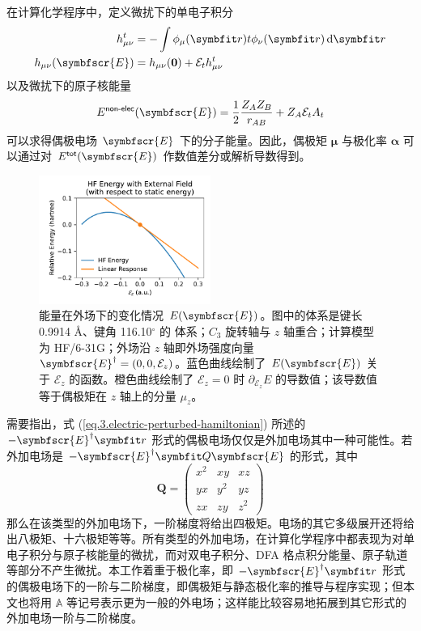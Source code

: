 在计算化学程序中，定义微扰下的单电子积分
\begin{align}
    h_{\mu \nu}^{t} &= - \int \phi_\mu (\bm{r}) t \phi_\nu (\bm{r}) \, \mathrm{d} \bm{r} \\
    \label{eq.3.def.huv-with-perturb}
    h_{\mu \nu} (\symbfscr{E}) &= h_{\mu \nu} (\mathbf{0}) + \mathcal{E}_t h_{\mu \nu}^t
\end{align}
以及微扰下的原子核能量
\begin{equation}
    E^\textsf{non-elec} (\symbfscr{E}) = \frac{1}{2} \frac{Z_A Z_B}{r_{AB}} + Z_A \mathcal{E}_t A_t
\end{equation}
可以求得偶极电场 $\symbfscr{E}$ 下的分子能量。因此，偶极矩 $\bm{\mu}$ 与极化率 $\bm{\alpha}$ 可以通过对 $E^\textsf{tot} (\symbfscr{E})$ 作数值差分或解析导数得到。

\begin{figure}
    \centering
    \includegraphics[width=0.5\textwidth]{assets/NumDipole-z.pdf}
    \caption[能量在外加偶极电场下的变化情况]{能量在外场下的变化情况 $E(\symbfscr{E})$。图中的体系是键长 0.9914 \AA、键角 116.10$^\circ$ 的  体系；$C_3$ 旋转轴与 $z$ 轴重合；计算模型为 HF/6-31G；外场沿 $z$ 轴即外场强度向量 $\symbfscr{E}^\dagger = (0, 0, \mathcal{E}_z)$。蓝色曲线绘制了 $E(\symbfscr{E})$ 关于 $\mathcal{E}_z$ 的函数。橙色曲线绘制了 $\mathcal{E}_z = 0$ 时 $\partial_{\mathcal{E}_z} E$ 的导数值；该导数值等于偶极矩在 $z$ 轴上的分量 $\mu_z$。}
    \label{fig.3.NumDipole-z}
\end{figure}

需要指出，式 (\ref{eq.3.electric-perturbed-hamiltonian}) 所述的 $- \symbfscr{E}^\dagger \bm{r}$ 形式的偶极电场仅仅是外加电场其中一种可能性。若外加电场是 $- \symbfscr{E}^\dagger \bm{Q} \symbfscr{E}$ 的形式，其中
\begin{equation*}
    \bm{Q} =
    \begin{pmatrix}
        x^2 & xy & xz \\
        yx & y^2 & yz \\
        zx & zy & z^2
    \end{pmatrix}
\end{equation*}
那么在该类型的外加电场下，一阶梯度将给出四极矩。电场的其它多级展开还将给出八极矩、十六极矩等等。所有类型的外加电场，在计算化学程序中都表现为对单电子积分与原子核能量的微扰，而对双电子积分、DFA 格点积分能量、原子轨道等部分不产生微扰。本工作着重于极化率，即 $- \symbfscr{E}^\dagger \bm{r}$ 形式的偶极电场下的一阶与二阶梯度，即偶极矩与静态极化率的推导与程序实现；但本文也将用 $\mathbb{A}$ 等记号表示更为一般的外电场；这样能比较容易地拓展到其它形式的外加电场一阶与二阶梯度。

